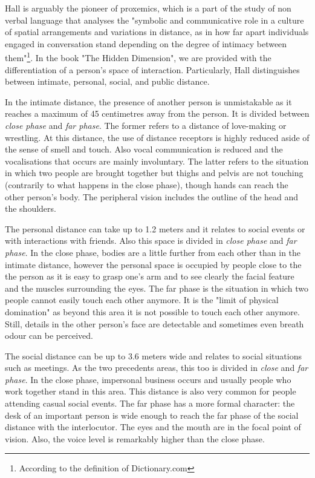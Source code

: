 \documentclass[../main.tex]{subfiles}
\begin{document}
Hall is arguably the pioneer of proxemics, which is a part of the study of non verbal language that analyses the "symbolic and communicative role in a culture of spatial arrangements and variations in distance, as in how far apart individuals engaged in conversation stand depending on the degree of intimacy between them"\footnote{According to the definition of Dictionary.com}. In the book "The Hidden Dimension", we are provided with the differentiation of a person's space of interaction. Particularly, Hall distinguishes between intimate, personal, social, and public distance.

In the intimate distance, the presence of another person is unmistakable as it reaches a maximum of 45 centimetres away from the person. It is divided between \textit{close phase} and \textit{far phase}. The former refers to a distance of love-making or wrestling. At this distance, the use of distance receptors is highly reduced aside of the sense of smell and touch. Also vocal communication is reduced and  the vocalisations that occurs are mainly involuntary. The latter refers to the situation in which two people are brought together but thighs and pelvis are not touching (contrarily to what happens in the close phase), though hands can reach the other person's body. The peripheral vision includes the outline of the head and the shoulders.

The personal distance can take up to 1.2 meters and it relates to social events or with interactions with friends. Also this space is divided in \textit{close phase} and \textit{far phase}. In the close phase, bodies are a little further from each other than in the intimate distance, however the personal space is occupied by people close to the the person as it is easy to grasp one's arm and to see clearly the facial feature and the muscles surrounding the eyes. The far phase is the situation in which two people cannot easily touch each other anymore. It is the "limit of physical domination"\autocite[120]{hall3} as beyond this area it is not possible to touch each other anymore. Still, details in the other person's face are detectable and sometimes even breath odour can be perceived.

The social distance can be up to 3.6 meters wide and relates to social situations such as meetings. As the two precedents areas, this too is divided in \textit{close} and \textit{far phase}. In the close phase, impersonal business occurs and usually people who work together stand in this area. This distance is also very common for people attending casual social events. The far phase has a more formal character: the desk of an important person is wide enough to reach the far phase of the social distance with the interlocutor. The eyes and the mouth are in the focal point of vision. Also, the voice level is remarkably higher than the close phase.
\end{document}

